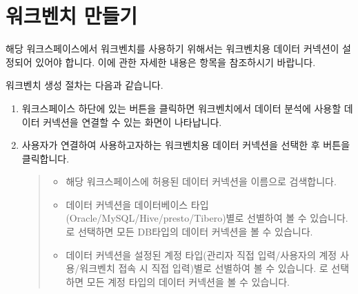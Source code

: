 \documentclass[letterpaper,10pt,english]{sphinxmanual}
\begin{document}
\section{워크벤치 만들기}
\label{\detokenize{discovery/part06/06_02-create_a_workbench:id1}}\label{\detokenize{discovery/part06/06_02-create_a_workbench::doc}}
해당 워크스페이스에서 워크벤치를 사용하기 위해서는 워크벤치용 데이터 커넥션이 설정되어 있어야 합니다.
이에 관한 자세한 내용은 {\hyperref[\detokenize{discovery/part02/data_connection::doc}]{}} 항목을 참조하시기 바랍니다.

워크벤치 생성 절차는 다음과 같습니다.
\begin{enumerate}
\def\theenumi{\arabic{enumi}}
\def\labelenumi{\theenumi .}
\makeatletter\def\p@enumii{\p@enumi \theenumi .}\makeatother
\item {} 
워크스페이스 하단에 있는  버튼을 클릭하면 워크벤치에서 데이터 분석에 사용할 데이터 커넥션을 연결할 수 있는 화면이 나타납니다.
\begin{quote}

\begin{figure}[H]
\centering

\noindent{}
\end{figure}
\end{quote}

\item {} 
사용자가 연결하여 사용하고자하는 워크벤치용 데이터 커넥션을 선택한 후  버튼을 클릭합니다.
\begin{quote}

\begin{figure}[H]
\centering

\noindent{}
\end{figure}
\begin{itemize}
\item {} 
 해당 워크스페이스에 허용된 데이터 커넥션을 이름으로 검색합니다.

\item {} 
 데이터 커넥션을 데이터베이스 타입(Oracle/MySQL/Hive/presto/Tibero)별로 선별하여 볼 수 있습니다. 로 선택하면 모든 DB타입의 데이터 커넥션을 볼 수 있습니다.

\item {} 
 데이터 커넥션을 설정된 계정 타입(관리자 직접 입력/사용자의 계정 사용/워크벤치 접속 시 직접 입력)별로 선별하여 볼 수 있습니다. 로 선택하면 모든 계정 타입의 데이터 커넥션을 볼 수 있습니다.


\end{itemize}
\end{quote}
\end{enumerate}
\end{document}
